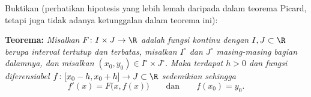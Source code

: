\begin{exercise} \label{exercise:peanoexistence}
Buktikan \emph{} (perhatikan hipotesis yang
lebih lemah daripada dalam teorema Picard, tetapi juga tidak adanya
ketunggalan dalam teorema ini):

\textbf{Teorema:} \emph{Misalkan $F \colon I \times J \to \R$ adalah
fungsi kontinu dengan
$I, J \subset \R$ berupa interval tertutup dan terbatas,
misalkan $I^\circ$ dan $J^\circ$ masing-masing bagian dalamnya,
dan
misalkan $(x_0,y_0) \in I^\circ \times J^\circ$.
Maka terdapat $h > 0$ dan fungsi diferensiabel
$f \colon [x_0 - h, x_0 + h] \to J \subset \R$ sedemikian sehingga}
\begin{equation*}
f'(x) = F\bigl(x,f(x)\bigr) \qquad \text{dan} \qquad f(x_0) = y_0.
\end{equation*}


\end{exercise}
